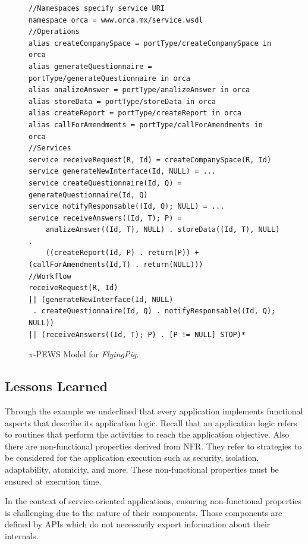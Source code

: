 \documentclass{singlecol-new}
\theoremstyle{TH}{
\newtheorem{lemma}{Lemma}
\newtheorem{theorem}[lemma]{Theorem}
\newtheorem{corrolary}[lemma]{Corrolary}
\newtheorem{conjecture}[lemma]{Conjecture}
\newtheorem{proposition}[lemma]{Proposition}
\newtheorem{claim}[lemma]{Claim}
\newtheorem{stheorem}[lemma]{Wrong Theorem}
\newtheorem{algorithm}{Algorithm}
}
\theoremstyle{THrm}{
\newtheorem{definition}{Definition}[section]
\newtheorem{question}{Question}[section]
\newtheorem{remark}{Remark}
\newtheorem{scheme}{Scheme}
}
\theoremstyle{THhit}{
\newtheorem{case}{Case}[section]
}
\theoremstyle{THhsl}{
\newtheorem{example}{Example}
}
\def\FlyingPig{\textsl{FlyingPig}\xspace}
\begin{document}
\begin{figure}[h]
\begin{scriptsize}
\begin{verbatim}
//Namespaces specify service URI
namespace orca = www.orca.mx/service.wsdl
//Operations
alias createCompanySpace = portType/createCompanySpace in orca
alias generateQuestionnaire = portType/generateQuestionnaire in orca
alias analizeAnswer = portType/analizeAnswer in orca
alias storeData = portType/storeData in orca
alias createReport = portType/createReport in orca
alias callForAmendments = portType/callForAmendments in orca
//Services
service receiveRequest(R, Id) = createCompanySpace(R, Id)
service generateNewInterface(Id, NULL) = ...
service createQuestionnaire(Id, Q) = generateQuestionnaire(Id, Q)
service notifyResponsable((Id, Q); NULL) = ...
service receiveAnswers((Id, T); P) =
	analizeAnswer((Id, T), NULL) . storeData((Id, T), NULL) . 
	((createReport(Id, P) . return(P)) + (callForAmendments(Id,T) . return(NULL)))
//Workflow
receiveRequest(R, Id)
|| (generateNewInterface(Id, NULL)
 . createQuestionnaire(Id, Q) . notifyResponsable((Id, Q); NULL))
|| (receiveAnswers((Id, T); P) . [P != NULL] STOP)*	
\end{verbatim}
\caption{$\pi$-PEWS Model for \FlyingPig.}\label{fig:piPEWSFlyingPig}
\end{scriptsize}
\end{figure}


\subsection{Lessons Learned}

Through the example we underlined that every application implements functional aspects that describe its application logic.
Recall that an application logic refers to routines that perform the activities to reach the application objective.
Also there are non-functional properties derived from NFR. 
They refer to strategies to be considered for the application execution such as security, isolation, adaptability, atomicity, and more.
These non-functional properties must be ensured at execution time.

In the context of service-oriented applications, ensuring non-functional properties is challenging due to the nature of their components.
Those components are defined by APIs which do not necessarily export information about their internals.
\end{document}
